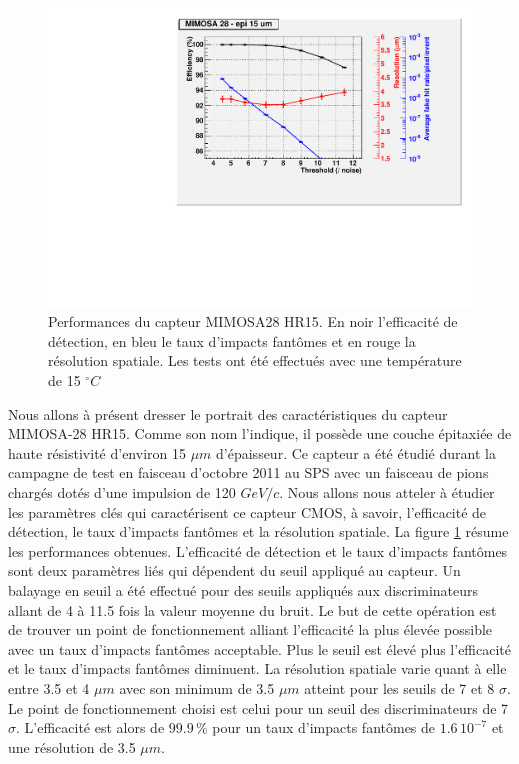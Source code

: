   \medskip
 
  \begin{figure}[!htb]
   \begin{center} 
    \includegraphics[scale=0.60]{./figures/Mi28_results.pdf}
    \caption{Performances du capteur MIMOSA28 HR15. En noir l'efficacit\'e de d\'etection, en bleu le taux d'impacts fant\^omes et en rouge la r\'esolution spatiale. Les tests ont \'et\'e effectu\'es avec une temp\'erature de 15 \ensuremath{^\circ C} }
    \label{fig:Mim28perf}
   \end{center}
  \end{figure} 

  Nous allons \`a pr\'esent dresser le portrait des caract\'eristiques du capteur MIMOSA-28 HR15. Comme son nom l'indique, il poss\`ede une couche épitaxiée de haute r\'esistivit\'e d'environ 15 $\mu m$ d'\'epaisseur. Ce capteur a \'et\'e \'etudi\'e durant la campagne de test en faisceau d'octobre 2011 au SPS avec un faisceau de pions charg\'es dot\'es d'une impulsion de 120 $GeV/c$. Nous allons nous atteler \`a \'etudier les param\`etres cl\'es qui caract\'erisent ce capteur CMOS, \`a savoir, l'efficacit\'e de d\'etection, le taux d'impacts fant\^omes et la r\'esolution spatiale. La figure \ref{fig:Mim28perf} r\'esume les performances obtenues. L'efficacit\'e de d\'etection et le taux d'impacts fant\^omes sont deux param\`etres li\'es qui d\'ependent du seuil appliqu\'e au capteur. Un balayage en seuil a \'et\'e effectu\'e pour des seuils appliqu\'es aux discriminateurs allant de 4 \`a 11.5 fois la valeur moyenne du bruit. Le but de cette op\'eration est de trouver un point de fonctionnement alliant l'efficacit\'e la plus \'elev\'ee possible avec un taux d'impacts fant\^omes acceptable. Plus le seuil est \'elev\'e plus l'efficacit\'e et le taux d'impacts fant\^omes diminuent. La r\'esolution spatiale varie quant \`a elle entre 3.5 et 4 $\mu m$ avec son minimum de 3.5 $\mu m$ atteint pour les seuils de 7 et 8 $\sigma$. Le point de fonctionnement choisi est celui pour un seuil des discriminateurs de 7 $\sigma$. L'efficacit\'e est alors de $99.9 \, \%$ pour un taux d'impacts fant\^omes de $1.6 \, 10^{-7}$ et une r\'esolution de 3.5 $\mu m$.
  
